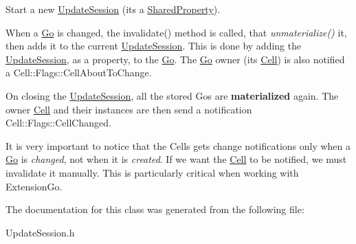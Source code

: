 \begin{DoxyItemize}
\item Start a new \mbox{\hyperlink{classHurricane_1_1UpdateSession}{Update\+Session}} (it\textquotesingle{}s a \mbox{\hyperlink{classHurricane_1_1SharedProperty}{Shared\+Property}}).
\item When a \mbox{\hyperlink{classHurricane_1_1Go}{Go}} is changed, the {\ttfamily invalidate()} method is called, that {\itshape unmaterialize()} it, then adds it to the current \mbox{\hyperlink{classHurricane_1_1UpdateSession}{Update\+Session}}. This is done by adding the \mbox{\hyperlink{classHurricane_1_1UpdateSession}{Update\+Session}}, as a property, to the \mbox{\hyperlink{classHurricane_1_1Go}{Go}}. The \mbox{\hyperlink{classHurricane_1_1Go}{Go}} owner (it\textquotesingle{}s \mbox{\hyperlink{classHurricane_1_1Cell}{Cell}}) is also notified a {\ttfamily Cell\+::\+Flags\+::\+Cell\+About\+To\+Change}.
\item On closing the \mbox{\hyperlink{classHurricane_1_1UpdateSession}{Update\+Session}}, all the stored Gos are {\bfseries materialized} again. The owner \mbox{\hyperlink{classHurricane_1_1Cell}{Cell}} and their instances are then send a notification {\ttfamily Cell\+::\+Flags\+::\+Cell\+Changed}.
\end{DoxyItemize}

It is very important to notice that the Cells gets change notifications only when a \mbox{\hyperlink{classHurricane_1_1Go}{Go}} is {\itshape changed}, not when it is {\itshape created}. If we want the \mbox{\hyperlink{classHurricane_1_1Cell}{Cell}} to be notified, we must invalidate it manually. This is particularly critical when working with Extension\+Go. 

The documentation for this class was generated from the following file\+:\begin{DoxyCompactItemize}
\item 
Update\+Session.\+h\end{DoxyCompactItemize}

